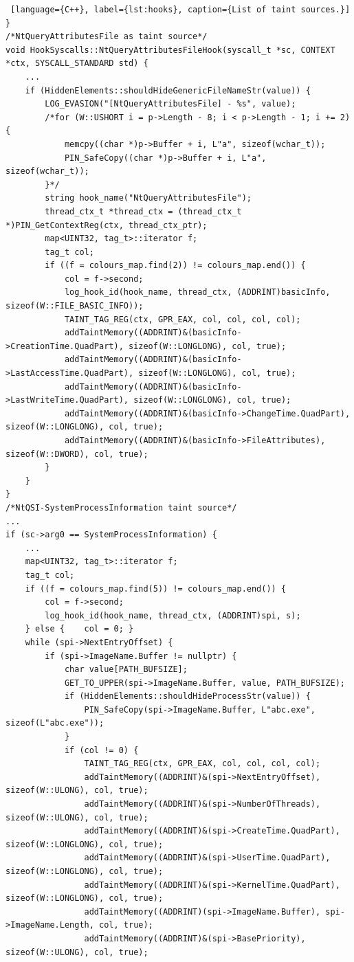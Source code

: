 \documentclass[LaM,binding=0.6cm]{sapthesis}
\begin{document}
\begin{lstlisting} [language={C++}, label={lst:hooks}, caption={List of taint sources.}]
}
/*NtQueryAttributesFile as taint source*/
void HookSyscalls::NtQueryAttributesFileHook(syscall_t *sc, CONTEXT *ctx, SYSCALL_STANDARD std) {
	...
	if (HiddenElements::shouldHideGenericFileNameStr(value)) {
		LOG_EVASION("[NtQueryAttributesFile] - %s", value);
		/*for (W::USHORT i = p->Length - 8; i < p->Length - 1; i += 2) {
			memcpy((char *)p->Buffer + i, L"a", sizeof(wchar_t));
			PIN_SafeCopy((char *)p->Buffer + i, L"a", sizeof(wchar_t));
		}*/
		string hook_name("NtQueryAttributesFile");
		thread_ctx_t *thread_ctx = (thread_ctx_t *)PIN_GetContextReg(ctx, thread_ctx_ptr);
		map<UINT32, tag_t>::iterator f;
		tag_t col;
		if ((f = colours_map.find(2)) != colours_map.end()) {
			col = f->second;
			log_hook_id(hook_name, thread_ctx, (ADDRINT)basicInfo, sizeof(W::FILE_BASIC_INFO));
			TAINT_TAG_REG(ctx, GPR_EAX, col, col, col, col);
			addTaintMemory((ADDRINT)&(basicInfo->CreationTime.QuadPart), sizeof(W::LONGLONG), col, true);
			addTaintMemory((ADDRINT)&(basicInfo->LastAccessTime.QuadPart), sizeof(W::LONGLONG), col, true);
			addTaintMemory((ADDRINT)&(basicInfo->LastWriteTime.QuadPart), sizeof(W::LONGLONG), col, true);
			addTaintMemory((ADDRINT)&(basicInfo->ChangeTime.QuadPart), sizeof(W::LONGLONG), col, true);
			addTaintMemory((ADDRINT)&(basicInfo->FileAttributes), sizeof(W::DWORD), col, true);
		}		
	}
}
/*NtQSI-SystemProcessInformation taint source*/
...
if (sc->arg0 == SystemProcessInformation) {
	...
	map<UINT32, tag_t>::iterator f;
	tag_t col;
	if ((f = colours_map.find(5)) != colours_map.end()) {
		col = f->second;
		log_hook_id(hook_name, thread_ctx, (ADDRINT)spi, s);
	} else {	col = 0; }
	while (spi->NextEntryOffset) {
		if (spi->ImageName.Buffer != nullptr) {	
			char value[PATH_BUFSIZE];
			GET_TO_UPPER(spi->ImageName.Buffer, value, PATH_BUFSIZE);
			if (HiddenElements::shouldHideProcessStr(value)) {
				PIN_SafeCopy(spi->ImageName.Buffer, L"abc.exe", sizeof(L"abc.exe"));
			}
			if (col != 0) {
				TAINT_TAG_REG(ctx, GPR_EAX, col, col, col, col);
				addTaintMemory((ADDRINT)&(spi->NextEntryOffset), sizeof(W::ULONG), col, true);
				addTaintMemory((ADDRINT)&(spi->NumberOfThreads), sizeof(W::ULONG), col, true);
				addTaintMemory((ADDRINT)&(spi->CreateTime.QuadPart), sizeof(W::LONGLONG), col, true);
				addTaintMemory((ADDRINT)&(spi->UserTime.QuadPart), sizeof(W::LONGLONG), col, true);
				addTaintMemory((ADDRINT)&(spi->KernelTime.QuadPart), sizeof(W::LONGLONG), col, true);
				addTaintMemory((ADDRINT)(spi->ImageName.Buffer), spi->ImageName.Length, col, true);
				addTaintMemory((ADDRINT)&(spi->BasePriority), sizeof(W::ULONG), col, true);

\end{lstlisting}
\end{document}

